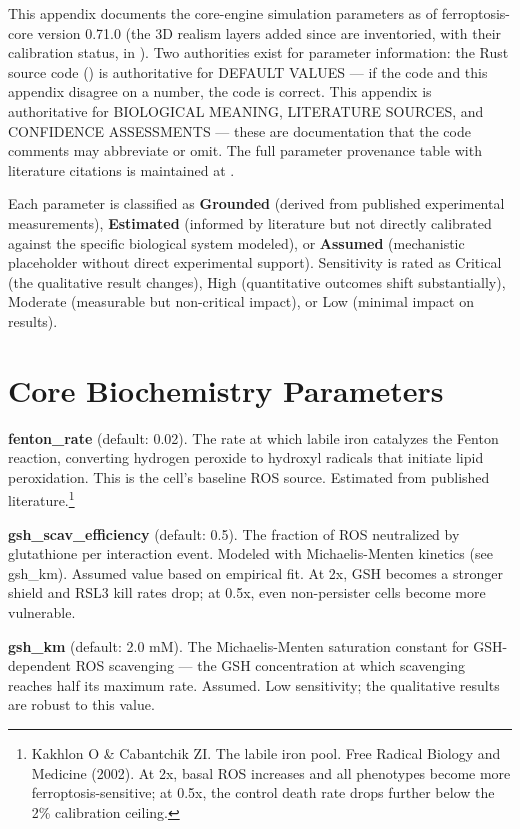 \documentclass[11pt,twoside,openright]{report}
\begin{document}
This appendix documents the core-engine simulation parameters as of ferroptosis-core version 0.71.0 (the 3D realism layers added since are inventoried, with their calibration status, in ). Two authorities exist for parameter information: the Rust source code () is authoritative for DEFAULT VALUES --- if the code and this appendix disagree on a number, the code is correct. This appendix is authoritative for BIOLOGICAL MEANING, LITERATURE SOURCES, and CONFIDENCE ASSESSMENTS --- these are documentation that the code comments may abbreviate or omit. The full parameter provenance table with literature citations is maintained at .

Each parameter is classified as \textbf{Grounded} (derived from published experimental measurements), \textbf{Estimated} (informed by literature but not directly calibrated against the specific biological system modeled), or \textbf{Assumed} (mechanistic placeholder without direct experimental support). Sensitivity is rated as Critical (the qualitative result changes), High (quantitative outcomes shift substantially), Moderate (measurable but non-critical impact), or Low (minimal impact on results).

\section{Core Biochemistry Parameters}

\textbf{fenton\_rate} (default: 0.02). The rate at which labile iron catalyzes the Fenton reaction, converting hydrogen peroxide to hydroxyl radicals that initiate lipid peroxidation. This is the cell's baseline ROS source. Estimated from published literature.\footnote{Kakhlon O \& Cabantchik ZI. The labile iron pool. Free Radical Biology and Medicine (2002). At 2x, basal ROS increases and all phenotypes become more ferroptosis-sensitive; at 0.5x, the control death rate drops further below the 2\% calibration ceiling.}

\textbf{gsh\_scav\_efficiency} (default: 0.5). The fraction of ROS neutralized by glutathione per interaction event. Modeled with Michaelis-Menten kinetics (see gsh\_km). Assumed value based on empirical fit. At 2x, GSH becomes a stronger shield and RSL3 kill rates drop; at 0.5x, even non-persister cells become more vulnerable.

\textbf{gsh\_km} (default: 2.0 mM). The Michaelis-Menten saturation constant for GSH-dependent ROS scavenging --- the GSH concentration at which scavenging reaches half its maximum rate. Assumed. Low sensitivity; the qualitative results are robust to this value.
\end{document}
